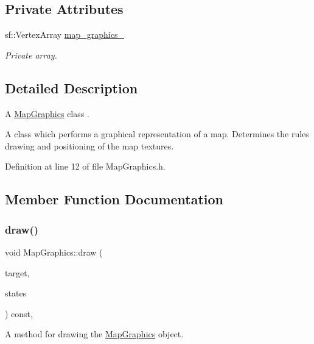 \subsection*{Private Attributes}
\begin{DoxyCompactItemize}
\item 
sf\+::\+Vertex\+Array \hyperlink{classMapGraphics_a2136d586176f0c3a008182ff3fba50e3}{map\+\_\+graphics\+\_\+}
\begin{DoxyCompactList}\small\item\em Private array. \end{DoxyCompactList}\end{DoxyCompactItemize}


\subsection{Detailed Description}
A \hyperlink{classMapGraphics}{Map\+Graphics} class . 

A class which performs a graphical representation of a map. Determines the rules drawing and positioning of the map textures. 

Definition at line 12 of file Map\+Graphics.\+h.



\subsection{Member Function Documentation}
\mbox{\label{classMapGraphics_a6bd8a1174e0f56edb00def916a096e3c}} 
\subsubsection{\texorpdfstring{draw()}{draw()}}
{\footnotesize\ttfamily void Map\+Graphics\+::draw (\begin{DoxyParamCaption}\item[{sf\+::\+Render\+Target \&}]{target,  }\item[{sf\+::\+Render\+States}]{states }\end{DoxyParamCaption}) const\hspace{0.3cm}{\ttfamily [override]}, {\ttfamily [private]}}



A method for drawing the \hyperlink{classMapGraphics}{Map\+Graphics} object. 



